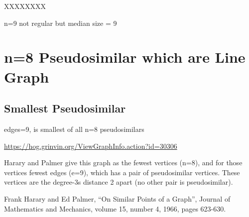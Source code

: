 \documentclass{article}
\begin{document}
XXXXXXXX

n=9 not regular but median size = 9

\begin{center}
\end{center}

\section{n=8 Pseudosimilar which are Line Graph}

\subsection{Smallest Pseudosimilar}

edges=9, is smallest of all n=8 pseudosimilars

\url{https://hog.grinvin.org/ViewGraphInfo.action?id=30306}

\smallskip

Harary and Palmer give this graph as the fewest vertices (n=8), and
for those vertices fewest edges (e=9), which has a pair of
pseudosimilar vertices.  These vertices are the degree-3s distance 2
apart (no other pair is pseudosimilar).

Frank Harary and Ed Palmer, ``On Similar Points of a Graph'', Journal of
Mathematics and Mechanics, volume 15, number 4, 1966, pages 623-630.
\end{document}
